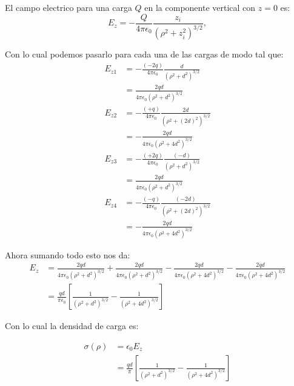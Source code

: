 \documentclass{report}
\begin{document}
\section{}

El campo electrico para una carga $Q$ en la componente vertical con $z=0$ es:
\[
E_z = -\frac{Q}{4\pi\epsilon_0} \frac{z_i}{\left(\rho^2 + z_i^2\right)^{3/2}},
\]

Con lo cual podemos pasarlo para cada una de las cargas de modo tal que:
\begin{align*}
  E_{z1} &= -\frac{(-2q)}{4\pi\epsilon_0} \frac{d}{\left(\rho^2 + d^2\right)^{3/2}}\\ &= \frac{2qd}{4\pi\epsilon_0 \left(\rho^2 + d^2\right)^{3/2}}\\
  E_{z2} &= -\frac{(+q)}{4\pi\epsilon_0} \frac{2d}{\left(\rho^2 + (2d)^2\right)^{3/2}}\\ &= -\frac{2qd}{4\pi\epsilon_0 \left(\rho^2 + 4d^2\right)^{3/2}}\\
  E_{z3} &= -\frac{(+2q)}{4\pi\epsilon_0} \frac{(-d)}{\left(\rho^2 + d^2\right)^{3/2}}\\ &= \frac{2qd}{4\pi\epsilon_0 \left(\rho^2 + d^2\right)^{3/2}}\\
  E_{z4} &= -\frac{(-q)}{4\pi\epsilon_0} \frac{(-2d)}{\left(\rho^2 + (2d)^2\right)^{3/2}}\\ &= -\frac{2qd}{4\pi\epsilon_0 \left(\rho^2 + 4d^2\right)^{3/2}}
\end{align*}

Ahora sumando todo esto nos da:
\begin{align*}
  E_z &= \frac{2qd}{4\pi\epsilon_0 \left(\rho^2 + d^2\right)^{3/2}} + \frac{2qd}{4\pi\epsilon_0 \left(\rho^2 + d^2\right)^{3/2}} - \frac{2qd}{4\pi\epsilon_0 \left(\rho^2 + 4d^2\right)^{3/2}} - \frac{2qd}{4\pi\epsilon_0 \left(\rho^2 + 4d^2\right)^{3/2}}\\
  &= \frac{qd}{\pi\epsilon_0} \left[ \frac{1}{\left(\rho^2 + d^2\right)^{3/2}} - \frac{1}{\left(\rho^2 + 4d^2\right)^{3/2}} \right]
\end{align*}

Con lo cual la densidad de carga es:

\begin{align*}
  \sigma(\rho) &= \epsilon_0 E_z\\
  &= \frac{qd}{\pi} \left[ \frac{1}{\left(\rho^2 + d^2\right)^{3/2}} - \frac{1}{\left(\rho^2 + 4d^2\right)^{3/2}} \right]
\end{align*}
\end{document}
